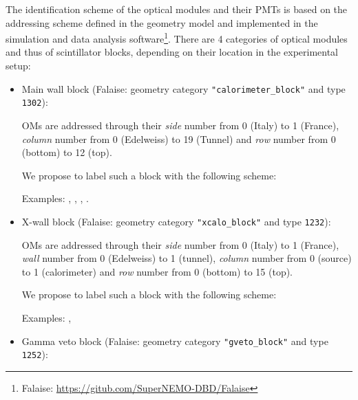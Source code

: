 
The  identification scheme  of the  optical  modules and their PMTs
is  based on  the
addressing scheme defined in the geometry model and implemented in the
simulation     and     data    analysis     software\footnote{Falaise:
  \url{https://gitub.com/SuperNEMO-DBD/Falaise}}.     There   are    4
categories  of  optical  modules  and  thus  of  scintillator  blocks,
depending on their location in the experimental setup:

\begin{itemize}
  
\item Main wall block (Falaise: geometry category \texttt{"calorimeter\_block"}
  and  type  \texttt{1302}):

  \par  OMs are  addressed  through  their
  \emph{side}   number from 0 (Italy)     to  1 (France),
  \emph{column} number from 0 (Edelweiss) to 19 (Tunnel) and
  \emph{row}    number from 0 (bottom)    to 12 (top).

  \par We  propose to label such a block with the following scheme:
  \begin{center}
  \end{center}
  \vskip 10pt
  \par\noindent Examples: , 
  , , .
  
\item X-wall block (Falaise: geometry category \texttt{"xcalo\_block"} and type
  \texttt{1232}):
  
  \par OMs  are addressed  through their
  \emph{side}   number from 0 (Italy)     to  1 (France),
  \emph{wall}   number from 0 (Edelweiss) to  1 (tunnel),
  \emph{column} number from 0 (source)    to  1 (calorimeter) and
  \emph{row}    number from 0 (bottom)    to 15 (top).
  
  \par  We propose  to
  label such a block with the following scheme:
  \begin{center}
  \end{center}
  \vskip 10pt
  \par\noindent Examples: , 
  
\item Gamma veto block  (Falaise: geometry category \texttt{"gveto\_block"} and
  type   \texttt{1252}):
  

\end{itemize}
